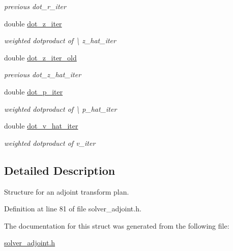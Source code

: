 \begin{DoxyCompactItemize}
\begin{DoxyCompactList}\small\item\em previous dot\-\_\-r\-\_\-iter \end{DoxyCompactList}\item 
\hypertarget{structinfct__adjoint__plan_ab848ecc31c17b9cd639e9834ee56816d}{double \hyperlink{structinfct__adjoint__plan_ab848ecc31c17b9cd639e9834ee56816d}{dot\-\_\-z\-\_\-iter}}\label{structinfct__adjoint__plan_ab848ecc31c17b9cd639e9834ee56816d}

\begin{DoxyCompactList}\small\item\em weighted dotproduct of \textbackslash{} z\-\_\-hat\-\_\-iter \end{DoxyCompactList}\item 
\hypertarget{structinfct__adjoint__plan_ad2417d37a566a0d26dea57f6f875ca12}{double \hyperlink{structinfct__adjoint__plan_ad2417d37a566a0d26dea57f6f875ca12}{dot\-\_\-z\-\_\-iter\-\_\-old}}\label{structinfct__adjoint__plan_ad2417d37a566a0d26dea57f6f875ca12}

\begin{DoxyCompactList}\small\item\em previous dot\-\_\-z\-\_\-hat\-\_\-iter \end{DoxyCompactList}\item 
\hypertarget{structinfct__adjoint__plan_a50526d4b81b2dd8cf90e82ad162af3c5}{double \hyperlink{structinfct__adjoint__plan_a50526d4b81b2dd8cf90e82ad162af3c5}{dot\-\_\-p\-\_\-iter}}\label{structinfct__adjoint__plan_a50526d4b81b2dd8cf90e82ad162af3c5}

\begin{DoxyCompactList}\small\item\em weighted dotproduct of \textbackslash{} p\-\_\-hat\-\_\-iter \end{DoxyCompactList}\item 
\hypertarget{structinfct__adjoint__plan_ac1b772ccfa72ce8e522298aeef3b1e1b}{double \hyperlink{structinfct__adjoint__plan_ac1b772ccfa72ce8e522298aeef3b1e1b}{dot\-\_\-v\-\_\-hat\-\_\-iter}}\label{structinfct__adjoint__plan_ac1b772ccfa72ce8e522298aeef3b1e1b}

\begin{DoxyCompactList}\small\item\em weighted dotproduct of v\-\_\-iter \end{DoxyCompactList}\end{DoxyCompactItemize}


\subsection{Detailed Description}
Structure for an adjoint transform plan. 

Definition at line 81 of file solver\-\_\-adjoint.\-h.



The documentation for this struct was generated from the following file\-:\begin{DoxyCompactItemize}
\item 
\hyperlink{solver__adjoint_8h}{solver\-\_\-adjoint.\-h}\end{DoxyCompactItemize}
